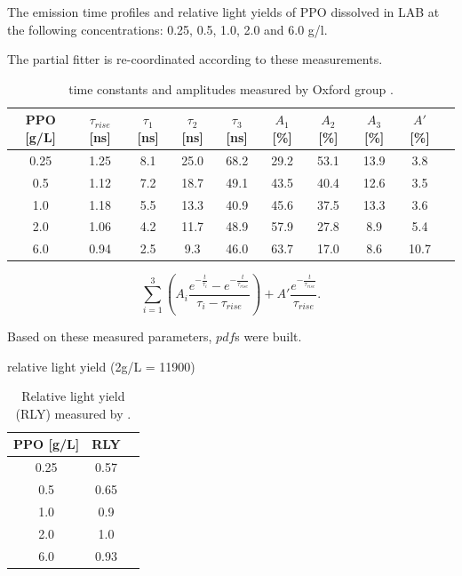 The emission time profiles and relative light yields of PPO dissolved in LAB at the following concentrations: 0.25, 0.5, 1.0, 2.0 and 6.0 g/l.

The partial fitter is re-coordinated according to these measurements.

\begin{table}[ht]
	\centering
	\caption{\label{oxfordMeasure} time constants and amplitudes measured by Oxford group \cite{oxfordMeasurement}.}	
	{\centering
		\begin{tabular*}{160mm}{c@{\extracolsep{\fill}}ccccccccc}
			\toprule 
			PPO [g/L] & $\tau_{rise}$ [ns] & $\tau_1$ [ns] & $\tau_2$ [ns] & $\tau_3$ [ns] & $A_1$ [\%]  & $A_2$ [\%]   & $A_3$ [\%]  & $A'$ [\%] \\
			\midrule
			0.25 & 1.25 & 8.1 & 25.0 & 68.2 & 29.2 & 53.1 & 13.9 & 3.8\\
			0.5  & 1.12 & 7.2 & 18.7 & 49.1 & 43.5 & 40.4 & 12.6 & 3.5 \\
			1.0 & 1.18 & 5.5 & 13.3 & 40.9 &	45.6 & 37.5 & 13.3 & 3.6 \\
			2.0 & 1.06 & 4.2 & 11.7 & 48.9 & 57.9 & 27.8 & 8.9 & 5.4	\\
			6.0 & 0.94 & 2.5 & 9.3  & 46.0 & 63.7 & 17.0 & 8.6 & 10.7\\
			\bottomrule	
		\end{tabular*}
	}
\end{table}


\begin{equation}
\sum_{i=1}^3 (A_i\frac{e^{-\frac{t}{\tau_i}}-e^{-\frac{t}{\tau_{rise}}}}{\tau_i-\tau_{rise}})+A'\frac{e^{-\frac{t}{\tau_{rise}}}}{\tau_{rise}}.
\end{equation}

Based on these measured parameters, $pdf$s were built. 


relative light yield (2g/L = 11900)
\begin{table}[ht]
	\centering
	\caption{\label{oxfordMeasure2}Relative light yield (RLY) measured by \cite{oxfordMeasurement}.}	
	{\centering
		\begin{tabular*}{60mm}{c@{\extracolsep{\fill}}cc}
			\toprule 
			PPO [g/L] & RLY \\
			\midrule
			0.25 & 0.57\\
			0.5 & 0.65\\
			1.0 & 0.9\\
			2.0 & 1.0\\
			6.0 & 0.93\\
			\bottomrule	
		\end{tabular*}
	}
\end{table}

